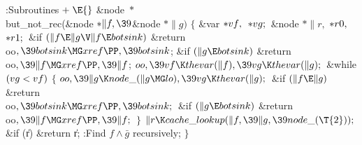 \Y\B\4:Subroutines\X${}\mathrel+\E{}$\6
\&{node} ${}{*}{}$\\{but\_not\_rec}(\&{node} ${}{*}\|f,\39{}$\&{node} ${}{*}%
\|g){}$\1\1\2\2\6
${}\{{}$\1\6
\&{var} ${}{*}\\{vf},{}$ ${}{*}\\{vg};{}$\6
\&{node} ${}{*}\|r,{}$ ${}{*}\\{r0},{}$ ${}{*}\\{r1};{}$\7
\&{if} ${}(\|f\E\|g\V\|f\E\\{botsink}){}$\1\5
\&{return} \\{oo}${},\39\\{botsink}\MG\\{xref}\PP,\39\\{botsink}{}$;\2\6
\&{if} ${}(\|g\E\\{botsink}){}$\1\5
\&{return} \\{oo}${},\39\|f\MG\\{xref}\PP,\39\|f{}$;\2\6
${}\\{oo},\39\\{vf}\K\\{thevar}(\|f),\39\\{vg}\K\\{thevar}(\|g);{}$\6
\&{while} ${}(\\{vg}<\\{vf}){}$\5
${}\{{}$\1\6
${}\\{oo},\39\|g\K\\{node\_}(\|g\MG\\{lo}),\39\\{vg}\K\\{thevar}(\|g);{}$\6
\&{if} ${}(\|f\E\|g){}$\1\5
\&{return} \\{oo}${},\39\\{botsink}\MG\\{xref}\PP,\39\\{botsink};{}$\2\6
\&{if} ${}(\|g\E\\{botsink}){}$\1\5
\&{return} \\{oo}${},\39\|f\MG\\{xref}\PP,\39\|f;{}$\2\6
\4${}\}{}$\2\6
${}\|r\K\\{cache\_lookup}(\|f,\39\|g,\39\\{node\_}(\T{2}));{}$\6
\&{if} (\|r)\1\5
\&{return} \|r;\2\6
:Find $f\land\bar g$ recursively\X;\6
\4${}\}{}$\2\par
\fi

